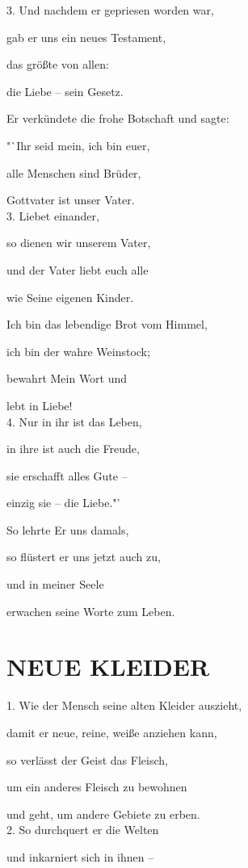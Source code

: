 \documentclass[11pt,a5paper,twoside]{article}
\begin{document}
3. Und nachdem er gepriesen worden war,

gab er uns ein neues Testament,

das größte von allen:

die Liebe -- sein Gesetz.

Er verkündete die frohe Botschaft und sagte:

"`Ihr seid mein, ich bin euer,

alle Menschen sind Brüder,

Gottvater ist unser Vater.\\



3. Liebet einander, 

so dienen wir unserem Vater,

und der Vater liebt euch alle
 
wie Seine eigenen Kinder.

Ich bin das lebendige Brot vom Himmel, 

ich bin der wahre Weinstock;

bewahrt Mein Wort und

lebt in Liebe!\\

4. Nur in ihr ist das Leben,

in ihre ist auch die Freude,

sie erschafft alles Gute --

einzig sie -- die Liebe."'

So lehrte Er uns damals,

so flüstert er uns jetzt auch zu,

und in meiner Seele

erwachen seine Worte zum Leben. 



\section[Neue Kleider]{NEUE KLEIDER}

1. Wie der Mensch seine alten Kleider auszieht,

damit er neue, reine, weiße anziehen kann,

so verlässt der Geist das Fleisch,

um ein anderes Fleisch zu bewohnen

und geht, um andere Gebiete zu erben.\\

2. So durchquert er die Welten

und inkarniert sich in ihnen --
\end{document}
